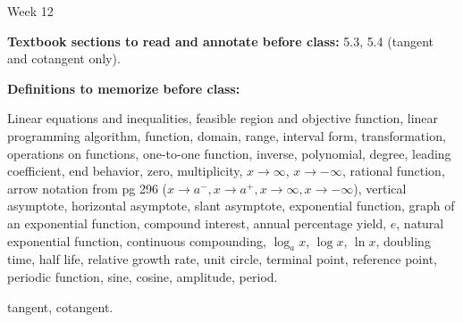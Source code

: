 \documentclass[12pt,dvipsnames]{article}
\begin{document}
\thispagestyle{empty}

	\begin{center}
		{\large{Week 12}}
	\end{center}

{\bfseries{Textbook sections to read and annotate before class:}} 5.3, 5.4 (tangent and cotangent only).

\smallskip

	{\bfseries{Definitions to memorize before class:}} 

\begin{description}[topsep=0pt,itemsep=-2ex,partopsep=0ex,parsep=1ex]
\item[From Weeks 1-10] Linear equations and inequalities, feasible region and objective function, linear programming algorithm,  function, domain, range, interval form, transformation, operations on functions, one-to-one function, inverse, polynomial, degree, leading coefficient, end behavior, zero, multiplicity, $x\to \infty$, $x\to -\infty$, rational function, arrow notation from pg 296 ($x\to a^{-}, x\to a^{+}, x\to \infty, x\to -\infty$), vertical asymptote, horizontal asymptote, slant asymptote, exponential function, graph of an exponential function, compound interest, annual percentage yield, $e$, natural exponential function, continuous compounding, $\log_a x$, $\log x$, $\ln x$, doubling time, half life, relative growth rate, unit circle, terminal point, reference point, periodic function, sine, cosine, amplitude, period.
\item[From Week 12] tangent, cotangent.
\end{description}
\smallskip	
	
		
		
\end{document}

